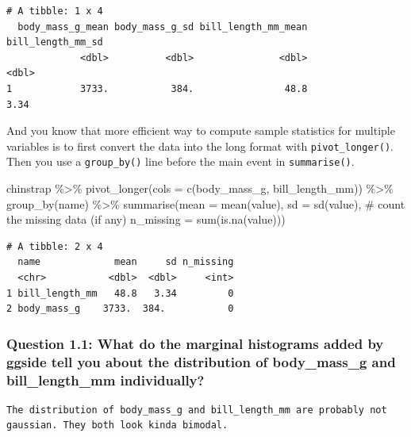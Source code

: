 \documentclass[
  letterpaper,
  DIV=11,
  numbers=noendperiod]{scrartcl}
\newenvironment{Shaded}{\begin{snugshade}}{\end{snugshade}}
\newcommand{\AttributeTok}[1]{\textcolor[rgb]{0.40,0.45,0.13}{#1}}
\newcommand{\CommentTok}[1]{\textcolor[rgb]{0.37,0.37,0.37}{#1}}
\newcommand{\FunctionTok}[1]{\textcolor[rgb]{0.28,0.35,0.67}{#1}}
\newcommand{\NormalTok}[1]{\textcolor[rgb]{0.00,0.23,0.31}{#1}}
\newcommand{\SpecialCharTok}[1]{\textcolor[rgb]{0.37,0.37,0.37}{#1}}
\begin{document}
\begin{verbatim}
# A tibble: 1 x 4
  body_mass_g_mean body_mass_g_sd bill_length_mm_mean bill_length_mm_sd
             <dbl>          <dbl>               <dbl>             <dbl>
1            3733.           384.                48.8              3.34
\end{verbatim}

And you know that more efficient way to compute sample statistics for
multiple variables is to first convert the data into the long format
with \texttt{pivot\_longer()}. Then you use a \texttt{group\_by()} line
before the main event in \texttt{summarise()}.

\begin{Shaded}
\begin{Highlighting}[]
\NormalTok{chinstrap }\SpecialCharTok{\%\textgreater{}\%} 
  \FunctionTok{pivot\_longer}\NormalTok{(}\AttributeTok{cols =} \FunctionTok{c}\NormalTok{(body\_mass\_g, bill\_length\_mm)) }\SpecialCharTok{\%\textgreater{}\%} 
  \FunctionTok{group\_by}\NormalTok{(name) }\SpecialCharTok{\%\textgreater{}\%} 
  \FunctionTok{summarise}\NormalTok{(}\AttributeTok{mean =} \FunctionTok{mean}\NormalTok{(value),}
            \AttributeTok{sd =} \FunctionTok{sd}\NormalTok{(value),}
            \CommentTok{\# count the missing data (if any)}
            \AttributeTok{n\_missing =} \FunctionTok{sum}\NormalTok{(}\FunctionTok{is.na}\NormalTok{(value))) }
\end{Highlighting}
\end{Shaded}

\begin{verbatim}
# A tibble: 2 x 4
  name             mean     sd n_missing
  <chr>           <dbl>  <dbl>     <int>
1 bill_length_mm   48.8   3.34         0
2 body_mass_g    3733.  384.           0
\end{verbatim}

\subsubsection{Question 1.1: What do the marginal histograms added by
ggside tell you about the distribution of body\_mass\_g and
bill\_length\_mm
individually?}\label{question-1.1-what-do-the-marginal-histograms-added-by-ggside-tell-you-about-the-distribution-of-body_mass_g-and-bill_length_mm-individually}

\begin{verbatim}
The distribution of body_mass_g and bill_length_mm are probably not gaussian. They both look kinda bimodal.
\end{verbatim}
\end{document}
